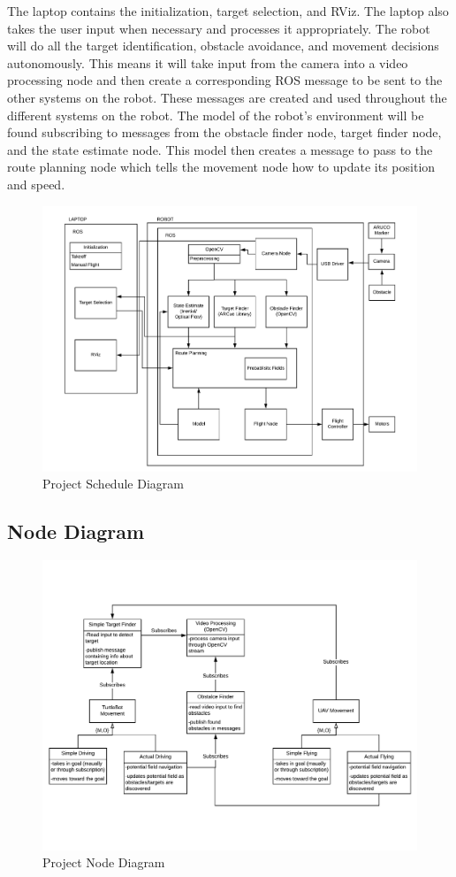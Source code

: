 \documentclass{article}
\begin{document}
	The laptop contains the initialization, target selection, and RViz. The laptop also takes the user input when necessary and processes it appropriately.  The robot will do all the target identification, obstacle avoidance, and movement decisions autonomously. This means it will take input from the camera into a video processing node and then create a corresponding ROS message to be sent to the other systems on the robot. These messages are created and used throughout the different systems on the robot. The model of the robot's environment will be found subscribing to messages from the obstacle finder node, target finder node, and the state estimate node. This model then creates a message to pass to the route planning node which tells the movement node how to update its position and speed. 

	\begin{figure}[H]
		\centering
		\includegraphics[width=0.9\linewidth]{BlockDiagram}
		\caption{Project Schedule Diagram}
		\label{fig:blockdiagram}
	\end{figure}

	\subsection{Node Diagram}

	\begin{figure}[H]
		\centering
		\includegraphics[width=0.9\linewidth]{NodeDiagram}
		\caption{Project Node Diagram}
		\label{fig:nodediagram}
	\end{figure}
\end{document}
